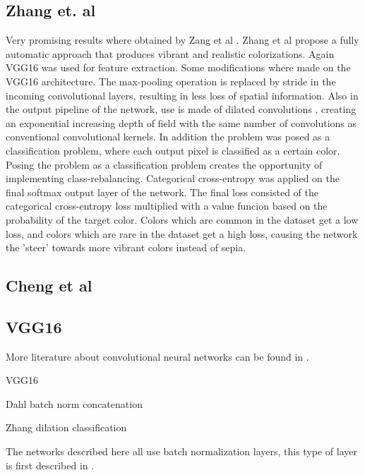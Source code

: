\subsection{Zhang et. al}
Very promising results where obtained by Zang et al \cite{Zhang}. Zhang et al propose a fully
automatic approach that produces vibrant and realistic colorizations. Again VGG16 was used for feature extraction. Some modifications where made on the VGG16 architecture. The max-pooling operation is replaced by stride in the incoming convolutional layers, resulting in less loss of spatial information. Also in the output pipeline of the network, use is made of dilated convolutions \cite{yu2015multi}, creating an exponential increasing depth of field with the same number of convolutions as conventional convolutional kernels. In addition the problem was posed as a classification problem, where each output pixel is classified as a certain color. Posing the problem as a classification problem creates the opportunity of implementing class-rebalancing. Categorical cross-entropy was applied on the final softmax output layer of the network. The final loss consisted of the categorical cross-entropy loss multiplied with a value funcion based on the probability of the target color. Colors which are common in the dataset get a low loss, and colors which are rare in the dataset get a high loss, causing the network the 'steer' towards more vibrant colors instead of sepia. 




\subsection{Cheng et al}

\subsection{VGG16}




More literature about convolutional neural networks can be found in \cite{GoodfellowBOOK}. 


%

VGG16




Dahl
batch norm
concatenation




Zhang
dilation
classification









The networks described here all use batch normalization layers, this type of layer is first described in \cite{ioffe2015batch}. 

